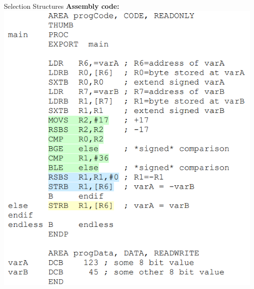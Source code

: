 \begin{example2}{Selection Structures}
\textbf{Assembly code:}\\
\includegraphics[width=0.9\linewidth]{images/assemblycodeex2.png}
\end{example2}

